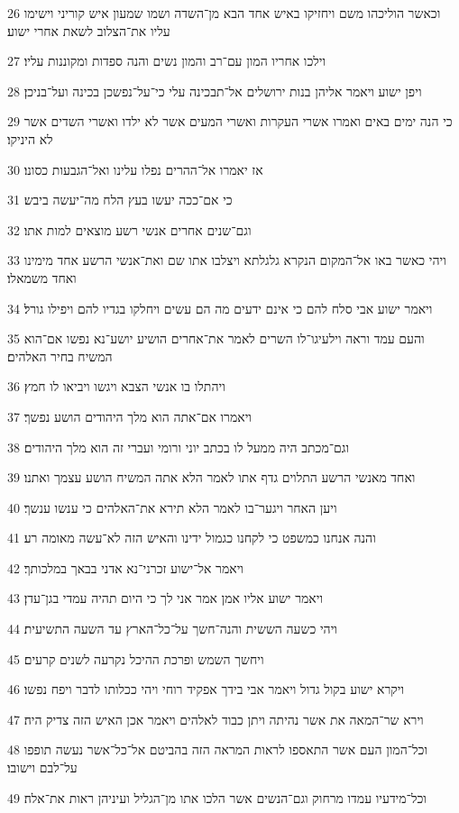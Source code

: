 \par 26 וכאשר הוליכהו משם ויחזיקו באיש אחד הבא מן־השדה ושמו שמעון איש קוריני וישימו עליו את־הצלוב לשאת אחרי ישוע׃
\par 27 וילכו אחריו המון עם־רב והמון נשים והנה ספדות ומקוננות עליו׃
\par 28 ויפן ישוע ויאמר אליהן בנות ירושלים אל־תבכינה עלי כי־על־נפשכן בכינה ועל־בניכן׃
\par 29 כי הנה ימים באים ואמרו אשרי העקרות ואשרי המעים אשר לא ילדו ואשרי השדים אשר לא היניקו׃
\par 30 אז יאמרו אל־ההרים נפלו עלינו ואל־הגבעות כסונו׃
\par 31 כי אם־ככה יעשו בעץ הלח מה־יעשה ביבש׃
\par 32 וגם־שנים אחרים אנשי רשע מוצאים למות אתו׃
\par 33 ויהי כאשר באו אל־המקום הנקרא גלגלתא ויצלבו אתו שם ואת־אנשי הרשע אחד מימינו ואחד משמאלו׃
\par 34 ויאמר ישוע אבי סלח להם כי אינם ידעים מה הם עשים ויחלקו בגדיו להם ויפילו גורל׃
\par 35 והעם עמד וראה וילעיגו־לו השרים לאמר את־אחרים הושיע יושע־נא נפשו אם־הוא המשיח בחיר האלהים׃
\par 36 ויהתלו בו אנשי הצבא ויגשו ויביאו לו חמץ׃
\par 37 ויאמרו אם־אתה הוא מלך היהודים הושע נפשך׃
\par 38 וגם־מכתב היה ממעל לו בכתב יוני ורומי ועברי זה הוא מלך היהודים׃
\par 39 ואחד מאנשי הרשע התלוים גדף אתו לאמר הלא אתה המשיח הושע עצמך ואתנו׃
\par 40 ויען האחר ויגער־בו לאמר הלא תירא את־האלהים כי ענשו ענשך׃
\par 41 והנה אנחנו כמשפט כי לקחנו כגמול ידינו והאיש הזה לא־עשה מאומה רע׃
\par 42 ויאמר אל־ישוע זכרני־נא אדני בבאך במלכותך׃
\par 43 ויאמר ישוע אליו אמן אמר אני לך כי היום תהיה עמדי בגן־עדן׃
\par 44 ויהי כשעה הששית והנה־חשך על־כל־הארץ עד השעה התשיעית׃
\par 45 ויחשך השמש ופרכת ההיכל נקרעה לשנים קרעים׃
\par 46 ויקרא ישוע בקול גדול ויאמר אבי בידך אפקיד רוחי ויהי ככלותו לדבר ויפח נפשו׃
\par 47 וירא שר־המאה את אשר נהיתה ויתן כבוד לאלהים ויאמר אכן האיש הזה צדיק היה׃
\par 48 וכל־המון העם אשר התאספו לראות המראה הזה בהביטם אל־כל־אשר נעשה תופפו על־לבם וישובו׃
\par 49 וכל־מידעיו עמדו מרחוק וגם־הנשים אשר הלכו אתו מן־הגליל ועיניהן ראות את־אלה׃

